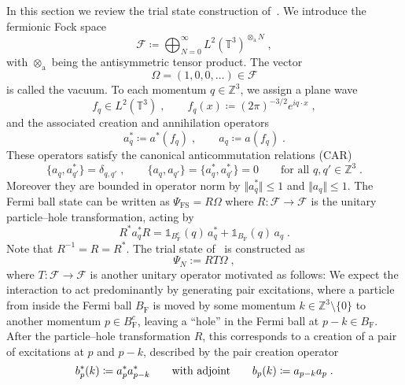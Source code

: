 \documentclass[12pt,a4paper]{article}
\numberwithin{equation}{section}
\newcommand{\cF}{\mathcal{F}}
\newcommand{\TTT}{\mathbb{T}}
\newcommand{\ZZZ}{\mathbb{Z}}
\newcommand{\1}{\mathbb{I}}
\newcommand{\F}{\mathrm{F}}
\newcommand{\FS}{\mathrm{FS}}
\newcommand{\Z}{\mathbb{Z}}
\newcommand{\T}{\mathbb{T}}
\theoremstyle{plain}
\theoremstyle{definition}
\theoremstyle{remark}
\theoremstyle{plain}
\theoremstyle{definition}
\theoremstyle{remark}
\begin{document}
In this section we review the trial state construction of~\cite{CHN23}. We introduce the fermionic Fock space
\begin{equation}
	\cF \coloneq \bigoplus_{N=0}^\infty L^2(\T^3)^{\otimes_{\mathrm{a}} N} \;,
\end{equation}
with $ \otimes_{\mathrm{a}} $ being the antisymmetric tensor product. The vector
\begin{equation}
\Omega = (1,0,0,\ldots) \in \cF
\end{equation}
is called the vacuum. To each momentum $ q \in \ZZZ^3 $, we assign a plane wave
\begin{equation}
	f_q \in L^2(\TTT^3) \;, \qquad
	f_q(x) \coloneq (2 \pi)^{-3/2} e^{i q \cdot x} \;,
\end{equation}
and the associated creation and annihilation operators
\begin{equation}
	a^*_q \coloneq a^*(f_q) \;, \qquad
	a_q \coloneq a(f_q) \;.
\end{equation}
These operators satisfy the canonical anticommutation relations (CAR)
\begin{equation} \label{eq:CAR}
	\{a_q, a_{q'}^*\} = \delta_{q, q'} \;, \qquad
	\{a_q, a_{q'}\} = \{a_q^*, a_{q'}^*\} = 0 \qquad \text{for all } q, q' \in \ZZZ^3\;.
\end{equation}
Moreover they are bounded in operator norm by $ \Vert a_q^* \Vert \leq 1$ and $\Vert a_q \Vert \le 1 $.
The Fermi ball state can be written as $ \Psi_{\FS} = R \Omega $ where $ R: \cF \to \cF $ is the unitary particle--hole transformation, acting by
\begin{equation} \label{eq:R}
	R^* a_q^* R 	= \mathds{1}_{B_{\F}^c}(q) \, a_q^* 	+ \mathds{1}_{B_{\F}}(q) \, a_q \;.
\end{equation}
Note that $ R^{-1} = R = R^* $. The trial state of~\cite{CHN23} is constructed as
\begin{equation} \label{eq:Psitrial}
	\Psi_N := R T \Omega \;,
\end{equation}
where $ T: \cF \to \cF $ is another unitary operator motivated as follows: We expect the interaction to act predominantly by generating pair excitations, where a particle from inside the Fermi ball $ B_{\F} $ is moved by some momentum $ k \in \Z^3 \setminus \{ 0 \} $ to another momentum $ p \in B_{\F}^c $, leaving a ``hole'' in the Fermi ball at $ p-k \in B_{\F} $. After the particle--hole transformation $ R $, this corresponds to a creation of a pair of excitations at $ p $ and $ p-k $, described by the pair creation operator
\begin{equation} \label{eq:b}
	b^*_p(k) \coloneq a_p^* a_{p-k}^* 
	\qquad \textnormal{with adjoint} \qquad
	b_p(k) \coloneq a_{p-k} a_p \;.
\end{equation}
\end{document}
